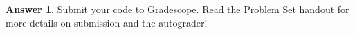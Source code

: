 \documentclass[12pt]{article}
\renewcommand{\(}{\left(}
\renewcommand{\)}{\right)}
\theoremstyle{definition}
\newtheorem*{answer}{Answer}
\begin{document}
\begin{enumerate}
    \begin{shaded}
    \begin{answer}
Submit your code to Gradescope. Read the Problem Set handout for more details on submission and the autograder!
    \end{answer}
    \end{shaded}
    \newpage



\end{enumerate}
\end{document}
